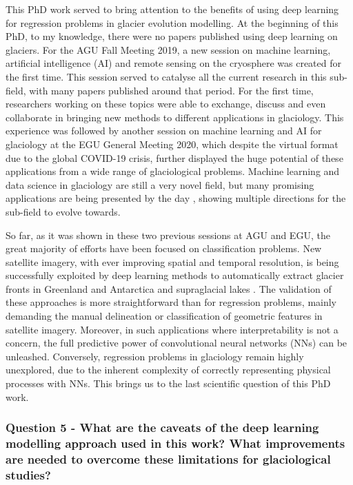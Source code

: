 This PhD work served to bring attention to the benefits of using deep learning for regression problems in glacier evolution modelling. At the beginning of this PhD, to my knowledge, there were no papers published using deep learning on glaciers. For the AGU Fall Meeting 2019, a new session on machine learning, artificial intelligence (AI) and remote sensing on the cryosphere was created for the first time. This session served to catalyse all the current research in this sub-field, with many papers published around that period. For the first time, researchers working on these topics were able to exchange, discuss and even collaborate in bringing new methods to different applications in glaciology. This experience was followed by another session on machine learning and AI for glaciology at the EGU General Meeting 2020, which despite the virtual format due to the global COVID-19 crisis, further displayed the huge potential of these applications from a wide range of glaciological problems. Machine learning and data science in glaciology are still a very novel field, but many promising applications are being presented by the day \citep[e.g.][]{leong_deepbedmap_2020, brinkerhoff_constraining_2020}, showing multiple directions for the sub-field to evolve towards. 

So far, as it was shown in these two previous sessions at AGU and EGU, the great majority of efforts have been focused on classification problems. New satellite imagery, with ever improving spatial and temporal resolution, is being successfully exploited by deep learning methods to automatically extract glacier fronts in Greenland and Antarctica \citep[e.g.][]{lea_google_2018,baumhoer_automated_2019,mohajerani_detection_2019, zhang_automatically_2019} and supraglacial lakes \cite[e.g.][]{yuan_automatic_2020}. The validation of these approaches is more straightforward than for regression problems, mainly demanding the manual delineation or classification of geometric features in satellite imagery. Moreover, in such applications where interpretability is not a concern, the full predictive power of convolutional neural networks (NNs) can be unleashed. Conversely, regression problems in glaciology remain highly unexplored, due to the inherent complexity of correctly representing physical processes with NNs. This brings us to the last scientific question of this PhD work.

\subsubsection{Question 5 - What are the caveats of the deep learning modelling approach used in this work? What improvements are needed to overcome these limitations for glaciological studies?}

